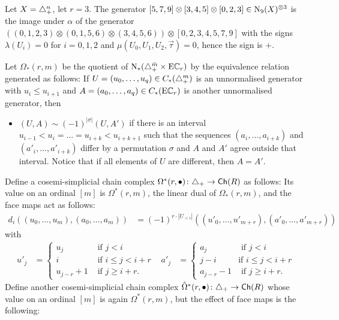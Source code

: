 \begin{example}\label{ex:102}
	Let $X = \triangle_{+}^n$, let $r= 3$. The generator $[5,7,9]\otimes [3,4,5]\otimes [0,2,3]\in \operatorname{N}_9(X)^{\otimes 3}$ is the image under $\alpha$ of the generator $((0,1,2,3)\otimes (0,1,5,6)\otimes (3,4,5,6))\otimes [0,2,3,4,5,7,9]$ with the signs $\lambda(U_i) = 0$ for $i=0,1,2$ and $\mu(U_0,U_1,U_2,\vec{\tau}) = 0$, hence the sign is $+$.
\end{example}
Let $\Omega_*(r,m)$ be the quotient of $\operatorname{N}_*(\triangle_{+}^{{\bar{m}}}\times \mathrm{E}\mathbb{C}_r)$ by the equivalence relation generated as follows: If $U = (u_0,\ldots,u_q)\in C_*(\triangle_{+}^m)$ is an unnormalised generator with $u_i\leq u_{i+1}$ and $A = (a_0,\ldots,a_q)\in C_*(\mathrm{E}\mathbb{C}_r)$ is another unnormalised generator, then
\begin{itemize}
	\item $(U,A)\sim (-1)^{|\sigma|}(U,A')$ if there is an interval $u_{i-1}<u_i =\ldots =u_{i+k}<u_{i+k+1}$ such that the sequences $(a_i,\ldots,a_{i+k})$ and $(a'_i,\ldots,a'_{i+k})$ differ by a permutation $\sigma$ and $A$ and $A'$ agree outside that interval. Notice that if all elements of $U$ are different, then $A=A'$.
\end{itemize}
Define a cosemi-simplicial chain complex $\Omega^*(r,\bullet)\colon \triangle_{+}\to \mathsf{Ch}(R)$ as follows: Its value on an ordinal $[m]$ is $\Omega^*(r,m)$, the linear dual of $\Omega_*(r,m)$, and the face maps act as follows:
\begin{align*}
	d_i((u_0,\ldots,u_m), (a_0,\ldots,a_m)) &= (-1)^{r\cdot |U_{<i}|}((u'_0,\ldots,u'_{m+r}),(a'_0,\ldots,a'_{m+r}))
\end{align*}
with
\begin{align}\label{eq:Theta}
	u'_j &=
	\begin{cases}
		u_j &\text{ if $j<i$} \\
		i & \text{ if $i\leq j < i+r$} \\
		u_{j-r} + 1 & \text{ if $j\geq i+r$.}
	\end{cases}
	&
	a'_j &=
	\begin{cases}
		a_j &\text{ if $j<i$} \\
		j-i & \text{if $i\leq j<i+r$} \\
		a_{j-r}-1 & \text{ if $j\geq i+r$.}
	\end{cases}
\end{align}
Define another cosemi-simplicial chain complex $\hat{\Omega}^*(r,\bullet)\colon \triangle_{+}\to \mathsf{Ch}(R)$ whose value on an ordinal $[m]$ is again $\Omega^*(r,m)$, but the effect of face maps is the following:
